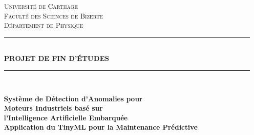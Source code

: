 \documentclass[oneside, french, a4paper, 12pt, reqno]{book}
\newcommand{\HRule}[1][\linewidth]{\rule{#1}{0.5mm}}
\begin{document}
\pagestyle{pfeStyle}
\frontmatter  %

\begin{titlepage}
    \thispagestyle{empty}
    \begin{center}
        \vspace*{-2cm}
        
        \textsc{\Large Université de Carthage}\\[0.5cm]
        \textsc{\Large Faculté des Sciences de Bizerte}\\[0.5cm]
        \textsc{Département de Physique}\\[1.5cm]
        
        \HRule[0.8\textwidth]\\[0.4cm]
        {\huge\bfseries PROJET DE FIN D'ÉTUDES}\\[0.2cm]
        \HRule[0.8\textwidth]\\[1.5cm]
        
        \begin{tcolorbox}[
            colback=Gris2,
            colframe=chapterColor,
            boxrule=2pt,
            arc=0mm,
            width=0.9\textwidth,
            center
        ]
            \centering
            \Large\bfseries Système de Détection d'Anomalies pour\\
            Moteurs Industriels basé sur\\
            l'Intelligence Artificielle Embarquée\\[0.5cm]
            \large Application du TinyML pour la Maintenance Prédictive
        \end{tcolorbox}
        
        \vspace{1.5cm}
        

\end{center}
\end{titlepage}
\end{document}
